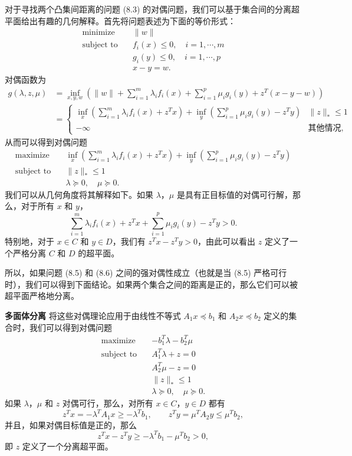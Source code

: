 \documentclass[UTF8, 12pt, fontset=fandol, oneside]{ctexart}
\begin{document}
对于寻找两个凸集间距离的问题 (8.3) 的对偶问题，我们可以基于集合间的分离超平面给出有趣的几何解释。首先将问题表述为下面的等价形式：
\begin{equation}
\begin{aligned}
\text{minimize}\quad & \|w\|\\
\text{subject to}\quad & f_i(x)\leq 0,\quad i=1,\cdots,m\\
& g_i(y)\leq 0,\quad i=1,\cdots,p\\
& x-y=w.
\end{aligned}
\tag{8.5}
\end{equation}
对偶函数为
\[
\begin{aligned}
g(\lambda,z,\mu)
&=\inf_{x,y,w}\left(\|w\|+\sum_{i=1}^m\lambda_i f_i(x)+\sum_{i=1}^p\mu_i g_i(y)+z^T(x-y-w)\right)\\
&=
\begin{cases}
\displaystyle\inf_x\left(\sum_{i=1}^m\lambda_i f_i(x)+z^Tx\right)
+\inf_y\left(\sum_{i=1}^p\mu_i g_i(y)-z^Ty\right) & \|z\|_\ast\leq 1\\
-\infty & \text{其他情况},
\end{cases}
\end{aligned}
\]
从而可以得到对偶问题
\begin{equation}
\begin{aligned}
\text{maximize}\quad & \displaystyle\inf_x\left(\sum_{i=1}^m\lambda_i f_i(x)+z^Tx\right)
+\inf_y\left(\sum_{i=1}^p\mu_i g_i(y)-z^Ty\right)\\
\text{subject to}\quad & \|z\|_\ast\leq 1\\
& \lambda\succeq 0,\quad \mu\succeq 0.
\end{aligned}
\tag{8.6}
\end{equation}
我们可以从几何角度将其解释如下。如果 $\lambda$，$\mu$ 是具有正目标值的对偶可行解，那么，对于所有 $x$ 和 $y$，
\[
\sum_{i=1}^m\lambda_i f_i(x)+z^Tx+\sum_{i=1}^p\mu_i g_i(y)-z^Ty>0.
\]
特别地，对于 $x\in C$ 和 $y\in D$，我们有 $z^Tx-z^Ty>0$，由此可以看出 $z$ 定义了一个严格分离 $C$ 和 $D$ 的超平面。

所以，如果问题 (8.5) 和 (8.6) 之间的强对偶性成立（也就是当 (8.5) 严格可行时），我们可以得到下面结论。如果两个集合之间的距离是正的，那么它们可以被超平面严格地分离。

\noindent\textbf{多面体分离}\quad
将这些对偶理论应用于由线性不等式 $A_1x\preceq b_1$ 和 $A_2x\preceq b_2$ 定义的集合时，我们可以得到对偶问题
\[
\begin{aligned}
\text{maximize}\quad & -b_1^T\lambda-b_2^T\mu\\
\text{subject to}\quad & A_1^T\lambda+z=0\\
& A_2^T\mu-z=0\\
& \|z\|_\ast\leq 1\\
& \lambda\succeq 0,\quad \mu\succeq 0.
\end{aligned}
\]
如果 $\lambda$，$\mu$ 和 $z$ 对偶可行，那么，对所有 $x\in C$，$y\in D$ 都有
\[
z^Tx=-\lambda^TA_1x\geq -\lambda^Tb_1,\qquad
z^Ty=\mu^TA_2y\leq \mu^Tb_2,
\]
并且，如果对偶目标值是正的，那么
\[
z^Tx-z^Ty\geq -\lambda^Tb_1-\mu^Tb_2>0,
\]
即 $z$ 定义了一个分离超平面。
\end{document}
